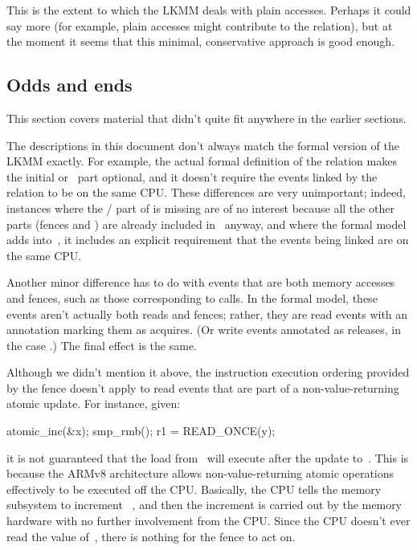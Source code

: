 This is the extent to which the LKMM deals with plain accesses.
Perhaps it could say more (for example, plain accesses might
contribute to the  relation), but at the moment it seems that this
minimal, conservative approach is good enough.


\subsection{Odds and ends}
\label{sec:docs:explanation:Odds and Ends}

This section covers material that didn't quite fit anywhere in the
earlier sections.

The descriptions in this document don't always match the formal
version of the LKMM exactly.
For example, the actual formal
definition of the  relation makes the initial  or~ part
optional, and it doesn't require the events linked by the relation to
be on the same CPU\@.
These differences are very unimportant; indeed,
instances where the / part of  is missing
are of no interest
because all the other parts (fences and ) are already included in~%
 anyway, and where the formal model adds  into~,
it includes
an explicit requirement that the events being linked are on the same
CPU\@.

Another minor difference has to do with events that are both memory
accesses and fences, such as those corresponding to 
calls.
In the formal model, these events aren't actually both reads
and fences; rather, they are read events with an annotation marking
them as acquires.
(Or write events annotated as releases, in the case
.)
The final effect is the same.

Although we didn't mention it above, the instruction execution
ordering provided by the  fence doesn't apply to read events
that are part of a non-value-returning atomic update.
For instance,
given:

\begin{VerbatimU}
	atomic_inc(&x);
	smp_rmb();
	r1 = READ_ONCE(y);
\end{VerbatimU}

\noindent%
it is not guaranteed that the load from~ will execute after the
update to~.
This is because the ARMv8 architecture allows
non-value-returning atomic operations effectively to be executed off
the CPU\@.
Basically, the CPU tells the memory subsystem to increment~%
, and then the increment is carried out by the memory hardware with
no further involvement from the CPU\@.
Since the CPU doesn't ever read
the value of~, there is nothing for the  fence to act on.

